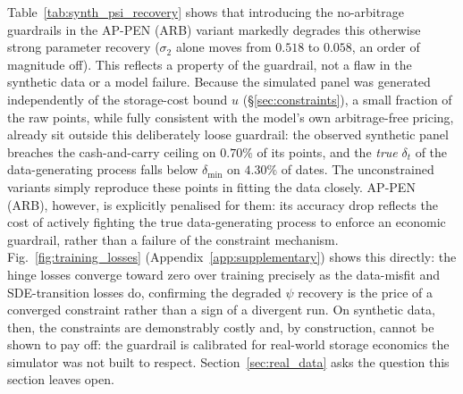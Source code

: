 \documentclass[sigconf, authorversion=true, nonacm=true]{acmart}
\begin{document}
Table~\ref{tab:synth_psi_recovery} shows that introducing the no-arbitrage guardrails in the AP-PEN (ARB) variant markedly degrades this otherwise strong parameter recovery ($\sigma_2$ alone moves from $0.518$ to $0.058$, an order of magnitude off). This reflects a property of the guardrail, not a flaw in the synthetic data or a model failure. Because the simulated panel was generated independently of the storage-cost bound $u$ (\S\ref{sec:constraints}), a small fraction of the raw points, while fully consistent with the model's own arbitrage-free pricing, already sit outside this deliberately loose guardrail: the observed synthetic panel breaches the cash-and-carry ceiling on $0.70\%$ of its points, and the \emph{true} $\delta_t$ of the data-generating process falls below $\delta_{\min}$ on $4.30\%$ of dates. The unconstrained variants simply reproduce these points in fitting the data closely. AP-PEN (ARB), however, is explicitly penalised for them: its accuracy drop reflects the cost of actively fighting the true data-generating process to enforce an economic guardrail, rather than a failure of the constraint mechanism. Fig.~\ref{fig:training_losses} (Appendix~\ref{app:supplementary}) shows this directly: the hinge losses converge toward zero over training precisely as the data-misfit and SDE-transition losses do, confirming the degraded $\psi$ recovery is the price of a converged constraint rather than a sign of a divergent run. On synthetic data, then, the constraints are demonstrably costly and, by construction, cannot be shown to pay off: the guardrail is calibrated for real-world storage economics the simulator was not built to respect. Section~\ref{sec:real_data} asks the question this section leaves open.


\end{document}

